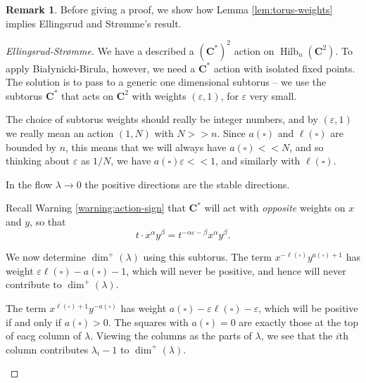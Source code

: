\documentclass{amsart}[12pt]
\theoremstyle{definition}
\newtheorem{remark}[dummy]{Remark}
\newcommand{\C}{\mathbf{C}}
\DeclareMathOperator{\Hilb}{Hilb}
\begin{document}
\begin{remark}
Before giving a proof, we show how Lemma \ref{lem:torus-weights} implies Ellingsrud and Str\o mme's result. 

\begin{proof}[Ellingsrud-Str\o mme]

  We have a described a $(\C^*)^2$ action on $\Hilb_n(\C^2)$.  To apply Bia\l ynicki-Birula, however, we need a $\C^*$ action with isolated fixed points.  The solution is to pass to a generic one dimensional subtorus -- we use the subtorus $\C^*$ that acts on $\C^2$ with weights $(\varepsilon,1)$, for $\varepsilon$ very small.

  The choice of subtorus weights should really be integer numbers, and by $(\varepsilon, 1)$ we really mean an action $(1, N)$ with $N>>n$. Since $a(\square)$ and $\ell(\square)$ are bounded by $n$, this means that we will always have $a(\square)<<N$, and so thinking about $\varepsilon$ as $1/N$, we have $a(\square)\varepsilon<<1$, and similarly with $\ell(\square)$.

In the flow $\lambda\to 0$ the positive directions are the stable directions.
  
Recall Warning \ref{warning:action-sign} that $\C^*$ will act with \emph{opposite} weights on $x$ and $y$, so that $$t\cdot x^\alpha y^\beta=t^{-\alpha\varepsilon-\beta}x^\alpha y^\beta.$$  

We now determine $\dim^+(\lambda)$ using this subtorus.  The term $x^{-\ell(\square)} y^{a(\square)+1}$ has weight $\varepsilon\ell(\square)-a(\square)-1$, which will never be positive, and hence will never contribute to $\dim^+(\lambda)$.

The term $x^{\ell(\square)+1}y^{-a(\square)}$ has weight $a(\square)-\varepsilon\ell(\square)-\varepsilon$, which will be positive if and only if $a(\square)>0$.  The squares with $a(\square)=0$ are exactly those at the top of eacg column of $\lambda$. Viewing the columns as the parts of $\lambda$, we see that the $i$th column contributes $\lambda_i-1$ to $\dim^+(\lambda)$.


\begin{center}
\end{center}


\end{proof}
\end{remark}
\end{document}
